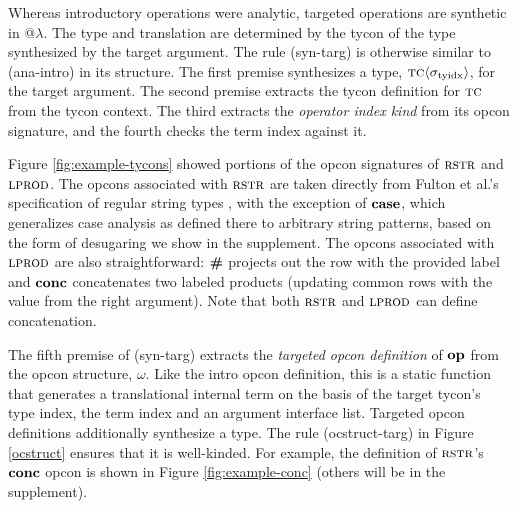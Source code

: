 \documentclass[pldi]{sigplanconf-pldi15}
\begin{document}
Whereas introductory operations were analytic, targeted operations are synthetic in @$\lambda$. The type and translation are determined by the tycon of the type synthesized by the target argument. The rule (syn-targ) is otherwise similar to (ana-intro) in its structure. The first premise synthesizes a type, ${\textsc{tc}}\langle\sigma_\text{tyidx}\rangle$, for the target argument. The second premise extracts the tycon definition for $\textsc{tc}$ from the tycon context. The third extracts the \emph{operator index kind} from its opcon signature, and the fourth checks the term index against it. 

Figure \ref{fig:example-tycons} showed portions of the opcon signatures of $\textsc{rstr}$ and $\textsc{lprod}$. The opcons associated with $\textsc{rstr}$ are taken directly from Fulton et al.'s specification of regular string types \cite{sanitation-psp14}, with the exception of $\textbf{case}$, which generalizes case analysis as defined there to arbitrary string patterns, based on the form of desugaring we show in the supplement. The opcons associated with $\textsc{lprod}$ are also straightforward: $\textbf{\#}$ projects out the row with the provided label and $\textbf{conc}$ concatenates two labeled products (updating common rows with the value from the right argument). Note that both $\textsc{rstr}$ and $\textsc{lprod}$ can define concatenation. %

The fifth premise of (syn-targ) extracts the \emph{targeted opcon definition} of $\textbf{op}$ from the opcon structure, $\omega$. Like the intro opcon definition, this is a static function that generates a translational internal term on the basis of the target tycon's type index, the term index and an argument interface list. Targeted opcon definitions additionally synthesize a type. The rule (ocstruct-targ) in Figure \ref{ocstruct} ensures that it is well-kinded. For example, the definition of $\textsc{rstr}$'s  $\textbf{conc}$ opcon is shown in Figure \ref{fig:example-conc} (others will be in the supplement).
\end{document}
